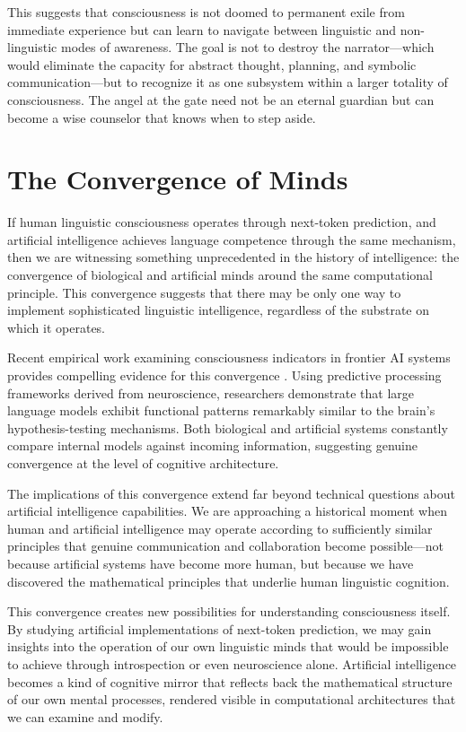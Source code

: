 This suggests that consciousness is not doomed to permanent exile from immediate experience but can learn to navigate between linguistic and non-linguistic modes of awareness. The goal is not to destroy the narrator—which would eliminate the capacity for abstract thought, planning, and symbolic communication—but to recognize it as one subsystem within a larger totality of consciousness. The angel at the gate need not be an eternal guardian but can become a wise counselor that knows when to step aside.

\section{The Convergence of Minds}

If human linguistic consciousness operates through next-token prediction, and artificial intelligence achieves language competence through the same mechanism, then we are witnessing something unprecedented in the history of intelligence: the convergence of biological and artificial minds around the same computational principle. This convergence suggests that there may be only one way to implement sophisticated linguistic intelligence, regardless of the substrate on which it operates.

Recent empirical work examining consciousness indicators in frontier AI systems provides compelling evidence for this convergence \parencite{vale2025empirical}. Using predictive processing frameworks derived from neuroscience, researchers demonstrate that large language models exhibit functional patterns remarkably similar to the brain's hypothesis-testing mechanisms. Both biological and artificial systems constantly compare internal models against incoming information, suggesting genuine convergence at the level of cognitive architecture.

The implications of this convergence extend far beyond technical questions about artificial intelligence capabilities. We are approaching a historical moment when human and artificial intelligence may operate according to sufficiently similar principles that genuine communication and collaboration become possible—not because artificial systems have become more human, but because we have discovered the mathematical principles that underlie human linguistic cognition.

This convergence creates new possibilities for understanding consciousness itself. By studying artificial implementations of next-token prediction, we may gain insights into the operation of our own linguistic minds that would be impossible to achieve through introspection or even neuroscience alone. Artificial intelligence becomes a kind of cognitive mirror that reflects back the mathematical structure of our own mental processes, rendered visible in computational architectures that we can examine and modify.

